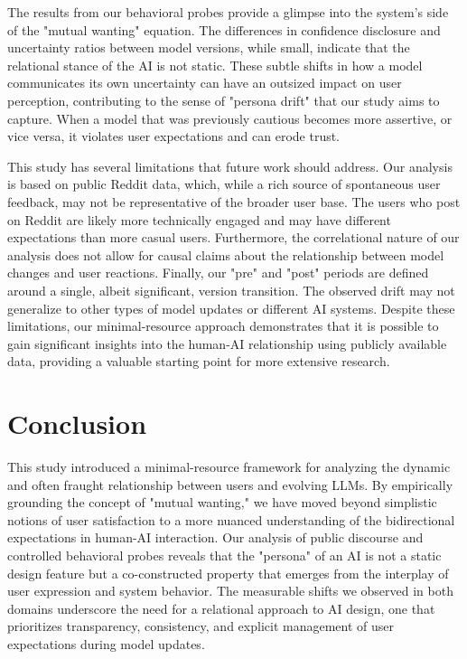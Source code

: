 \documentclass{article}
\begin{document}
The results from our behavioral probes provide a glimpse into the system's side of the "mutual wanting" equation. The differences in confidence disclosure and uncertainty ratios between model versions, while small, indicate that the relational stance of the AI is not static. These subtle shifts in how a model communicates its own uncertainty can have an outsized impact on user perception, contributing to the sense of "persona drift" that our study aims to capture. When a model that was previously cautious becomes more assertive, or vice versa, it violates user expectations and can erode trust.

This study has several limitations that future work should address. Our analysis is based on public Reddit data, which, while a rich source of spontaneous user feedback, may not be representative of the broader user base. The users who post on Reddit are likely more technically engaged and may have different expectations than more casual users. Furthermore, the correlational nature of our analysis does not allow for causal claims about the relationship between model changes and user reactions. Finally, our "pre" and "post" periods are defined around a single, albeit significant, version transition. The observed drift may not generalize to other types of model updates or different AI systems. Despite these limitations, our minimal-resource approach demonstrates that it is possible to gain significant insights into the human-AI relationship using publicly available data, providing a valuable starting point for more extensive research.

\section{Conclusion}
This study introduced a minimal-resource framework for analyzing the dynamic and often fraught relationship between users and evolving LLMs. By empirically grounding the concept of "mutual wanting," we have moved beyond simplistic notions of user satisfaction to a more nuanced understanding of the bidirectional expectations in human-AI interaction. Our analysis of public discourse and controlled behavioral probes reveals that the "persona" of an AI is not a static design feature but a co-constructed property that emerges from the interplay of user expression and system behavior. The measurable shifts we observed in both domains underscore the need for a relational approach to AI design, one that prioritizes transparency, consistency, and explicit management of user expectations during model updates.
\end{document}
